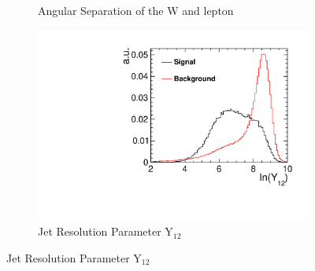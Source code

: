 \begin{figure}[]
\begin{subfigure}[]{0.5\linewidth}
    \caption{Angular Separation of the W and lepton} 
    \vspace{4ex}
  \end{subfigure}
  \begin{subfigure}[]{0.5\linewidth}
    \centering
    \includegraphics[width=0.75\linewidth]{Appendix/figures/Y12} 
    \caption{Jet Resolution Parameter Y$_{12}$} 
    \vspace{4ex}
  \end{subfigure}%
\end{figure}


